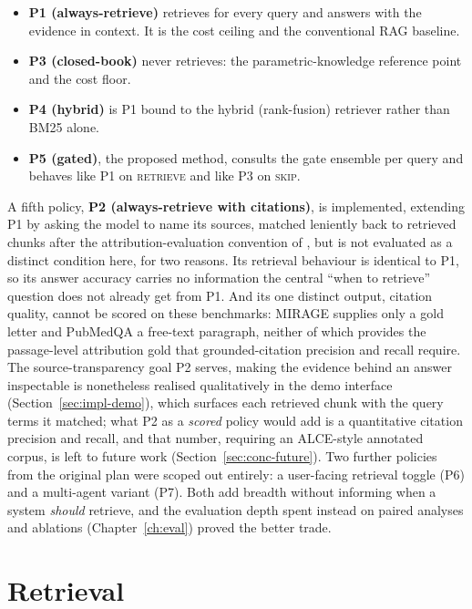 

\begin{itemize}
  \item \textbf{P1 (always-retrieve)} retrieves for every query and answers
    with the evidence in context. It is the cost ceiling and the conventional
    RAG baseline.
  \item \textbf{P3 (closed-book)} never retrieves: the parametric-knowledge
    reference point and the cost floor.
  \item \textbf{P4 (hybrid)} is P1 bound to the hybrid (rank-fusion)
    retriever rather than BM25 alone.
  \item \textbf{P5 (gated)}, the proposed method, consults the gate
    ensemble per query and behaves like P1 on \textsc{retrieve} and like P3 on
    \textsc{skip}.
\end{itemize}

A fifth policy, \textbf{P2 (always-retrieve with citations)}, is implemented,
extending P1 by asking the model to name its sources, matched leniently back to
retrieved chunks after the attribution-evaluation convention of
\citet{alce2023}, but is not evaluated as a distinct condition here, for two
reasons. Its retrieval behaviour is identical to P1, so its answer accuracy
carries no information the central ``when to retrieve'' question does not already
get from P1. And its one distinct output, citation quality, cannot be scored on
these benchmarks: MIRAGE supplies only a gold letter and PubMedQA a free-text
paragraph, neither of which provides the passage-level attribution gold that
grounded-citation precision and recall require. The source-transparency goal P2
serves, making the evidence behind an answer inspectable is nonetheless
realised qualitatively in the demo interface (Section~\ref{sec:impl-demo}),
which surfaces each retrieved chunk with the query terms it matched; what P2 as
a \emph{scored} policy would add is a quantitative citation precision and recall,
and that number, requiring an ALCE-style annotated corpus, is left to future
work (Section~\ref{sec:conc-future}). Two further policies from the original plan
were scoped out entirely: a user-facing retrieval toggle (P6) and a multi-agent
variant (P7). Both add breadth without informing when a system \emph{should}
retrieve, and the evaluation depth spent instead on paired analyses and
ablations (Chapter~\ref{ch:eval}) proved the better trade.

\section{Retrieval}
\label{sec:method-retrieval}

